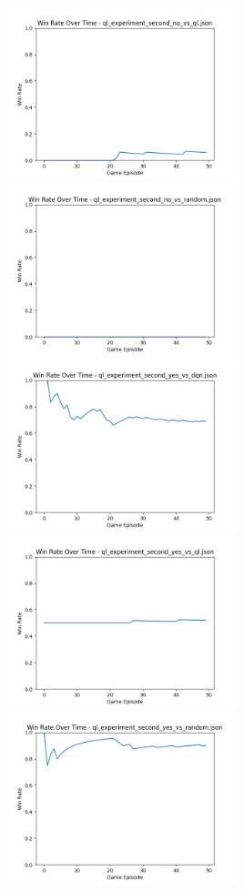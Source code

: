 \includegraphics[width=0.5\textwidth]{images/win_rate_ql_experiment_second_no_vs_ql.png} 
\includegraphics[width=0.5\textwidth]{images/win_rate_ql_experiment_second_no_vs_random.png} 
\includegraphics[width=0.5\textwidth]{images/win_rate_ql_experiment_second_yes_vs_dqn.png} 
\includegraphics[width=0.5\textwidth]{images/win_rate_ql_experiment_second_yes_vs_ql.png} 
\includegraphics[width=0.5\textwidth]{images/win_rate_ql_experiment_second_yes_vs_random.png} 
